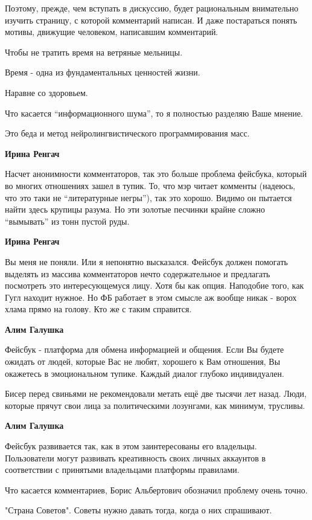 \begin{itemize}
\begin{itemize}
Поэтому, прежде, чем вступать в дискуссию, будет рациональным внимательно
изучить страницу, с которой комментарий написан. И даже постараться понять
мотивы, движущие человеком, написавшим комментарий.

Чтобы не тратить время на ветряные мельницы.

Время - одна из фундаментальных ценностей жизни.

Наравне со здоровьем.

Что касается \enquote{информационного шума}, то я полностью разделяю Ваше мнение.

Это беда и метод нейролингвистического программирования масс.

\textbf{Ирина Ренгач} 

Насчет анонимности комментаторов, так это больше проблема фейсбука, который во
многих отношениях зашел в тупик. То, что мэр читает комменты (надеюсь, что это
таки не \enquote{литературные негры}), так это хорошо. Видимо он пытается найти здесь
крупицы разума. Но эти золотые песчинки крайне сложно \enquote{вымывать} из тонн пустой
руды.

\textbf{Ирина Ренгач} 

Вы меня не поняли. Или я непонятно высказался. Фейсбук должен помогать выделять
из массива комментаторов нечто содержательное и предлагать посмотреть это
интересующемуся лицу. Хотя бы как опция. Наподобие того, как Гугл находит
нужное. Но ФБ работает в этом смысле аж вообще никак - ворох хлама прямо на
голову. Кто же с таким справится.

\textbf{Алим Галушка} 

Фейсбук - платформа для обмена информацией и общения. Если Вы будете ожидать от
людей, которые Вас не любят, хорошего к Вам отношения, Вы окажетесь в
эмоциональном тупике. Каждый диалог глубоко индивидуален.

Бисер перед свиньями не рекомендовали метать ещё две тысячи лет назад. Люди,
которые прячут свои лица за политическими лозунгами, как минимум, трусливы.

\textbf{Алим Галушка}

Фейсбук развивается так, как в этом заинтересованы его владельцы. Пользователи
могут развивать креативность своих личных аккаунтов в соответствии с принятыми
владельцами платформы правилами.

Что касается комментариев, Борис Альбертович обозначил проблему очень точно.

"Страна Советов". Советы нужно давать тогда, когда о них спрашивают.


\end{itemize}
\end{itemize}
